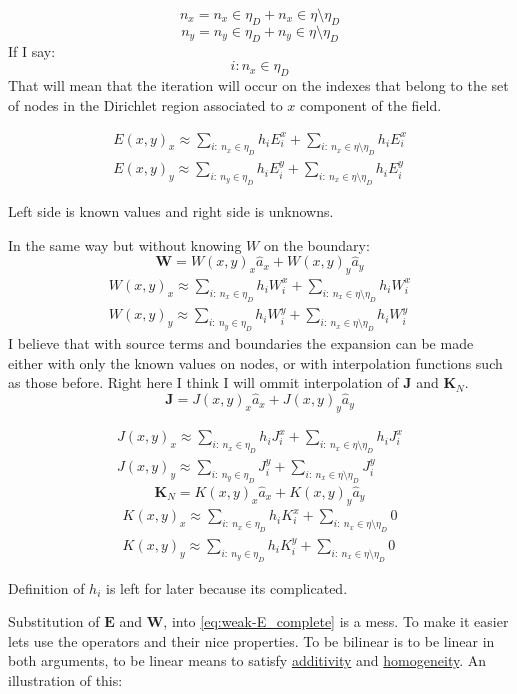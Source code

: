 $$n_x = n_x \in \eta_D + n_x \in \eta\setminus\eta_D $$
$$n_y = n_y \in \eta_D + n_y \in \eta\setminus\eta_D $$
If I say: $$i: n_x\in \eta_D$$  That will mean that the iteration will occur on the indexes that belong to the set of nodes in the Dirichlet region associated to $x$ component of the field.

\begin{align*}
E(x,y)_x\approx \sum_{i:\ n_x \in \eta_D} h_i E_i^x+\sum_{i:\ n_x \in \eta\setminus\eta_D} h_i E_i^x \\
E(x,y)_y\approx \sum_{i:\ n_y \in \eta_D}h_iE_i^y+
\sum_{i:\ n_x \in \eta\setminus\eta_D}h_iE_i^y
\end{align*}
 
Left side is known values and right side is unknowns.

In the same way but without knowing $W$ on the boundary:
$$\mathbf{W}=W(x,y)_x\hat{a}_x + W(x,y)_y \hat{a}_y $$
\begin{align*}
W(x,y)_x\approx \sum_{i:\ n_x \in \eta_D} h_i W_i^x+\sum_{i:\ n_x \in \eta\setminus\eta_D} h_i W_i^x \\
W(x,y)_y\approx \sum_{i:\ n_y \in \eta_D}h_iW_i^y+
\sum_{i:\ n_x \in \eta\setminus\eta_D}h_iW_i^y
\end{align*}
I believe that with source terms and boundaries the expansion can be made either with only the known values on nodes, or with interpolation functions such as those before.
Right here I think I will ommit interpolation of $\mathbf{J}$ and $\mathbf{K}_N$.
$$\mathbf{J}=J(x,y)_x\hat{a}_x + J(x,y)_y \hat{a}_y $$

\begin{align*}
J(x,y)_x\approx \sum_{i:\ n_x \in \eta_D}h_i J_i^x+\sum_{i:\ n_x \in \eta\setminus\eta_D}h_i J_i^x \\
J(x,y)_y\approx \sum_{i:\ n_y \in \eta_D}J_i^y+
\sum_{i:\ n_x \in \eta\setminus\eta_D}J_i^y
\end{align*}
$$\mathbf{K}_N=K(x,y)_x\hat{a}_x + K(x,y)_y \hat{a}_y $$
\begin{align*}
K(x,y)_x\approx \sum_{i:\ n_x \in \eta_D}h_i K_i^x+\sum_{i:\ n_x \in \eta\setminus\eta_D} 0 \\
K(x,y)_y\approx \sum_{i:\ n_y \in \eta_D}h_i K_i^y+
\sum_{i:\ n_x \in \eta\setminus\eta_D} 0
\end{align*}

Definition of $h_i$ is left for later because its complicated.

Substitution of $\mathbf{E}$ and $\mathbf{W}$, into \ref{eq:weak-E_complete} is a mess. To make it easier lets use the operators and their nice properties. To be bilinear is to be linear in both arguments, to be linear means to satisfy \href{http://en.wikipedia.org/wiki/Additive_function}{additivity} and \href{http://en.wikipedia.org/wiki/Homogeneous_function}{homogeneity}. An illustration of this:

